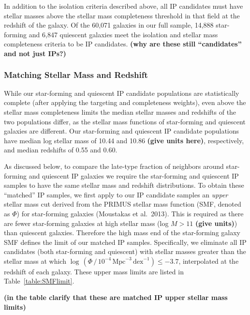 In addition to the isolation criteria described above, all IP candidates must have stellar masses above the stellar mass completeness threshold in that field 
at the redshift of the galaxy. 
Of the 60,071 galaxies in our full sample, 14,888 star-forming and 6,847 quiescent galaxies meet the isolation and stellar mass completeness criteria to be IP candidates.
{\bf(why are these still ``candidates'' and not just IPs?)}


\subsubsection{Matching Stellar Mass and Redshift}\label{sec:IPsample_matching}

While our star-forming and quiescent IP candidate populations are statistically complete (after applying the targeting and completeness weights), even above the stellar mass completeness limits the median stellar masses and redshifts of the two populations differ, as the stellar mass functions of star-forming and quiescent galaxies are different.
Our star-forming and quiescent IP candidate populations have median log stellar mass of 10.44 and 10.86 {\bf(give units here)}, respectively, and median redshifts of 0.55 and 0.60.

As discussed below, to compare the late-type fraction of neighbors around star-forming and quiescent IP galaxies we require the star-forming and quiescent IP samples to have the same stellar mass and redshift distributions.
To obtain these ``matched'' IP samples, we first apply to our IP candidate samples an {\it upper} stellar mass cut derived from the PRIMUS stellar mass function (SMF, denoted as $\Phi$) for star-forming galaxies (Moustakas et al.~2013).
This is required as there are fewer star-forming galaxies at high stellar mass 
(log $M>11$ {\bf(give units)}) than quiescent galaxies. Therefore the high 
mass end of the star-forming galaxy SMF defines the limit of our matched IP
samples.  
Specifically, we eliminate all IP candidates (both star-forming and quiescent) with stellar masses greater than the stellar mass at which ${\log\,(\Phi \,/\, 10^{-4}\,\text{Mpc}^{-3}\,\text{dex}^{-1}) \le -3.7}$, interpolated at the redshift of each galaxy.
These upper mass limits are listed in Table~\ref{table:SMFlimit}.


{\bf(in the table clarify that these are matched IP upper stellar mass limits)}

